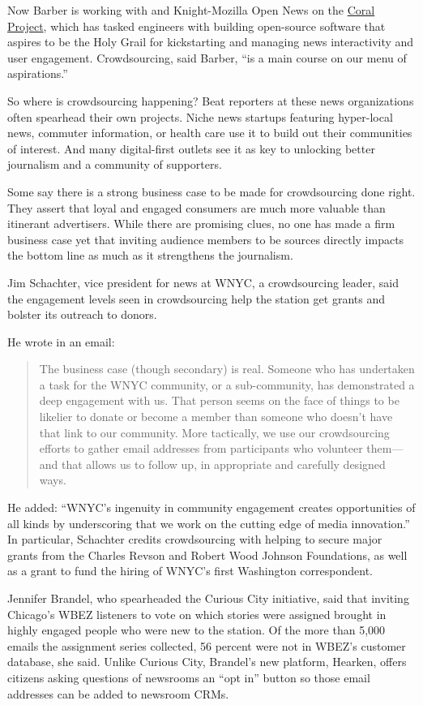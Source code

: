 \begin{itemize}
\begin{itemize}
Now Barber is working with  and Knight-Mozilla Open News on the \href{https://coralproject.net/}{Coral Project},\autocite{Coral} which has tasked engineers with building open-source software that aspires to be the Holy Grail for kickstarting and managing news interactivity and user engagement. Crowdsourcing, said Barber, ``is a main course on our menu of aspirations.'' 

So where is crowdsourcing happening? Beat reporters at these news organizations often spearhead their own projects. Niche news startups featuring hyper-local news, commuter information, or health care use it to build out their communities of interest. And many digital-first outlets see it as key to unlocking better journalism and a community of supporters. 

Some say there is a strong business case to be made for crowdsourcing done right. They assert that loyal and engaged consumers are much more valuable than itinerant advertisers. While there are promising clues, no one has made a firm business case yet that inviting audience members to be sources directly impacts the bottom line as much as it strengthens the journalism.

Jim Schachter, vice president for news at WNYC, a crowdsourcing leader, said the engagement levels seen in crowdsourcing help the station get grants and bolster its outreach to donors.\autocite{Schachter}

He wrote in an email:
\begin{quote}
The business case (though secondary) is real. Someone who has undertaken a task for the WNYC community, or a sub-community, has demonstrated a deep engagement with us. That person seems on the face of things to be likelier to donate or become a member than someone who doesn’t have that link to our community. More tactically, we use our crowdsourcing efforts to gather email addresses from participants who volunteer them---and that allows us to follow up, in appropriate and carefully designed ways.
\end{quote}
He added: ``WNYC’s ingenuity in community engagement creates opportunities of all kinds by underscoring that we work on the cutting edge of media innovation.'' In particular, Schachter credits crowdsourcing with helping to secure major grants from the Charles Revson and Robert Wood Johnson Foundations, as well as a grant to fund the hiring of WNYC’s first Washington correspondent. 

Jennifer Brandel, who spearheaded the Curious City initiative, said that inviting Chicago’s WBEZ listeners to vote on which stories were assigned brought in highly engaged people who were new to the station. Of the more than 5,000 emails the assignment series collected, 56 percent were not in WBEZ's customer database, she said. Unlike Curious City, Brandel’s new platform, Hearken, offers citizens asking questions of newsrooms an ``opt in'' button so those email addresses can be added to newsroom CRMs.\autocite{Brandel}


\end{itemize}
\end{itemize}
